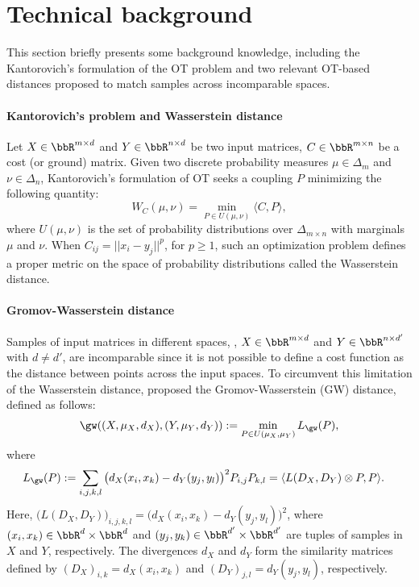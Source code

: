\section{Technical background}

This section briefly presents some background knowledge,
including the Kantorovich's formulation of the OT problem and two relevant OT-based distances
proposed to match samples across incomparable spaces.

\paragraph{Kantorovich's problem and Wasserstein distance}
Let $X \in \bbR^{m \times d}$ and $Y \in \bbR^{n \times d}$ be two input matrices,
$C \in \bbR^{m \times n}$ be a cost (or ground) matrix.
Given two discrete probability measures $\mu \in \Delta_m$ and $\nu \in \Delta_n$,
Kantorovich's formulation of OT seeks a coupling $P$ minimizing the following quantity:
\begin{equation}
  W_C(\mu,\nu) = \min_{P \in U(\mu, \nu)} \langle C, P \rangle,
  \label{eq:wasserstein}
 \end{equation}
where $U(\mu,\nu)$ is the set of probability distributions over
$\Delta_{m \times n}$ with marginals $\mu$ and $\nu$. When $C_{ij} = ||x_i - y_j||^p$, for $p \geq 1$,
such an optimization problem defines a proper metric on the space of
probability distributions called the Wasserstein distance.

\paragraph{Gromov-Wasserstein distance}
Samples of input matrices in different spaces, \ie, $X \in \bbR^{m \times d}$
and $Y \in \bbR^{n \times d'}$ with $d \neq d'$, are incomparable since
it is not possible to define a cost function as the distance between points across
the input spaces. To circumvent this limitation of the Wasserstein distance, \citep{Memoli11}
proposed the Gromov-Wasserstein (GW) distance, defined as follows:
\begin{align}
    \gw((X, \mu_X, d_X), (Y, \mu_Y, d_Y)) := \min_{P \in U(\mu_X, \mu_Y)} L_{\gw} (P),
\end{align}
where
\begin{align*}
\label{eq:gw_func}
    L_{\gw} (P) &:=
    \sum_{i,j,k,l} \big( d_X(x_i,x_k) - d_Y(y_j,y_l) \big)^2 P_{i,j}P_{k,l}
    = \langle L(D_X, D_Y) \otimes P, P \rangle.
\end{align*}
Here, $\big( L(D_X, D_Y) \big)_{i,j,k,l} = \big( d_X(x_i,x_k) - d_Y(y_j,y_l) \big)^2$,
where $(x_i, x_k) \in \bbR^d \times \bbR^d$ and $(y_j, y_k) \in \bbR^{d'} \times \bbR^{d'}$
are tuples of samples in $X$ and $Y$, respectively. The divergences
$d_X$ and $d_Y$ form the similarity matrices defined by $(D_X)_{i,k} = d_X(x_i,x_k)$ and
$(D_Y)_{j,l} = d_Y(y_j,y_l)$, respectively.

